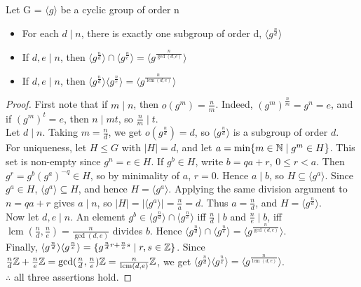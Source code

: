 \documentclass[../Odyssey_Project.tex]{subfiles}
\begin{document}
\begin{theorem}
\label{thm:1.4}
Let G = \(\langle g \rangle \) be a cyclic group of order n
\begin{itemize}
    \item For each \(d \mid n\), there is exactly one subgroup of order d, \(\langle g^{\frac{n}{d}}\rangle\)
    \item If \(d,e \mid n\), then \(\langle g^\frac{n}{d} \rangle \cap \langle g^\frac{n}{e}\rangle = \langle g^\frac{n}{\gcd(d,e)}\rangle\)
    \item If \(d,e \mid n\), then \(\langle g^\frac{n}{d} \rangle \langle g^\frac{n}{e}\rangle = \langle g^\frac{n}{\operatorname{lcm}(d,e)}\rangle\)
\end{itemize}
\end{theorem}
\begin{proof}
    First note that if \(m \mid n\), then \(o(g^m) = \frac{n}{m}\). Indeed, \((g^m)^{\frac{n}{m}} = g^n = e\), and if \((g^m)^t = e\), then \(n \mid mt\), so \(\frac{n}{m} \mid t\). \\
    Let \(d \mid n\). Taking \(m = \frac{n}{d}\), we get \(o(g^{\frac{n}{d}}) = d\), so \(\langle g^{\frac{n}{d}}\rangle\) is a subgroup of order \(d\). \\
    For uniqueness, let \(H \leq G\) with \(|H| = d\), and let \(a = \min\{m \in \mathbb{N} \mid g^m \in H\}\). This set is non-empty since \(g^n = e \in H\). If \(g^b \in H\), write \(b = qa + r\), \(0 \leq r < a\). Then \(g^r = g^b(g^a)^{-q} \in H\), so by minimality of \(a\), \(r = 0\). Hence \(a \mid b\), so \(H \subseteq \langle g^a\rangle\). Since \(g^a \in H\), \(\langle g^a\rangle \subseteq H\), and hence \(H = \langle g^a\rangle\). Applying the same division argument to \(n = qa+r\) gives \(a \mid n\), so \(|H| = |\langle g^a\rangle| = \frac{n}{a} = d\). Thus \(a = \frac{n}{d}\), and \(H = \langle g^{\frac{n}{d}}\rangle\). \\
    Now let \(d,e \mid n\). An element \(g^b \in \langle g^{\frac{n}{d}}\rangle \cap \langle g^{\frac{n}{e}}\rangle\) iff \(\frac{n}{d} \mid b\) and \(\frac{n}{e} \mid b\), iff \(\operatorname{lcm}(\frac{n}{d},\frac{n}{e}) = \frac{n}{\gcd(d,e)}\) divides \(b\). Hence \(\langle g^{\frac{n}{d}}\rangle \cap \langle g^{\frac{n}{e}}\rangle = \langle g^{\frac{n}{\gcd(d,e)}}\rangle\). \\
    Finally, \(\langle g^{\frac{n}{d}}\rangle\langle g^{\frac{n}{e}}\rangle = \{g^{\frac{n}{d}r+\frac{n}{e}s} \mid r,s \in \mathbb{Z}\}\). Since \(\frac{n}{d}\mathbb{Z} + \frac{n}{e}\mathbb{Z} = \gcd(\frac{n}{d},\frac{n}{e})\mathbb{Z} = \frac{n}{\operatorname{lcm}(d,e)}\mathbb{Z}\), we get \(\langle g^{\frac{n}{d}}\rangle\langle g^{\frac{n}{e}}\rangle = \langle g^{\frac{n}{\operatorname{lcm}(d,e)}}\rangle\). \\
    \(\therefore\) all three assertions hold.
\end{proof}
\end{document}

